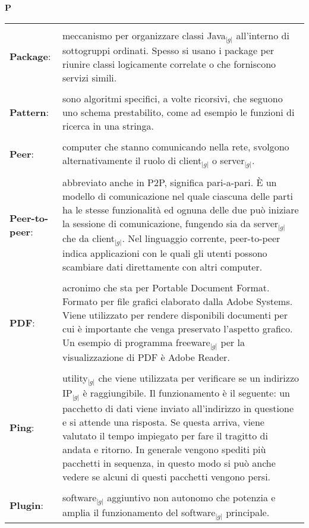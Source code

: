 \hfill\Huge{\textbf{P}}\\
\normalsize
	\begin{longtable}{p{} p{}} 
	    \toprule
	    \\
	    \textbf{Package}: 		&	meccanismo per organizzare classi Java$_{|g|}$ all'interno di sottogruppi ordinati. Spesso si usano i package per riunire classi logicamente correlate o che forniscono servizi simili.\\
	    \\
	    \textbf{Pattern}: 		&	sono algoritmi specifici, a volte ricorsivi, che seguono uno schema prestabilito, come ad esempio le funzioni di ricerca in una stringa.\\
	    \\
	    \textbf{Peer}:		&	computer che stanno comunicando nella rete, svolgono alternativamente il ruolo di client$_{|g|}$ o server$_{|g|}$.\\
	    \\
	    \textbf{Peer-to-peer}:	&	abbreviato anche in P2P, significa pari-a-pari. \`E un modello di comunicazione nel quale ciascuna delle parti ha le stesse funzionalità ed ognuna delle due può iniziare la sessione di comunicazione, fungendo sia da server$_{|g|}$ che da client$_{|g|}$. Nel linguaggio corrente, peer-to-peer indica applicazioni con le quali gli utenti possono 
						scambiare dati direttamente con altri computer.\\
	    \\
	    \textbf{PDF}:		&	acronimo che sta per Portable Document Format. Formato per file grafici elaborato dalla Adobe Systems. Viene utilizzato per rendere disponibili documenti per cui è importante che venga preservato l’aspetto grafico. Un esempio di programma freeware$_{|g|}$ per la visualizzazione di PDF è Adobe Reader.\\
	    \\
	    \textbf{Ping}:		&	utility$_{|g|}$ che viene utilizzata per verificare se un indirizzo IP$_{|g|}$ è raggiungibile. Il funzionamento è il seguente: un pacchetto di dati viene inviato all’indirizzo in questione e si attende una risposta. 
						Se questa arriva, viene valutato il tempo impiegato per fare il tragitto di andata e ritorno. In generale vengono spediti più pacchetti in sequenza, in questo modo si può anche vedere se alcuni di questi pacchetti vengono persi.\\
	    \\
	    \textbf{Plugin}:		&	software$_{|g|}$ aggiuntivo non autonomo che potenzia e amplia il funzionamento del software$_{|g|}$ principale.\\

\end{longtable}
